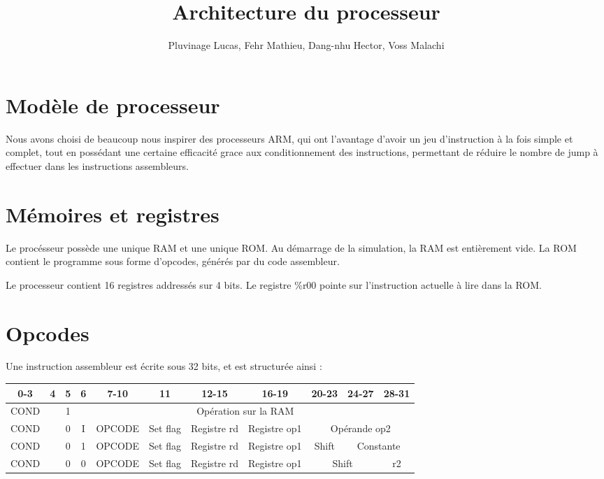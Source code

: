 \documentclass[a4paper]{article}
\title{Architecture du processeur}
\author{Pluvinage Lucas, Fehr Mathieu, Dang-nhu Hector, Voss Malachi}
\begin{document}
\maketitle

\section{Modèle de processeur}

Nous avons choisi de beaucoup nous inspirer des processeurs ARM, qui ont
l'avantage d'avoir un jeu d'instruction à la fois simple et complet, tout en
possédant une certaine efficacité grace aux conditionnement des instructions,
permettant de réduire le nombre de jump à effectuer dans les instructions
assembleurs.

\section{Mémoires et registres}

Le procésseur possède une unique RAM et une unique ROM. Au démarrage de la
simulation, la RAM est entièrement vide. La ROM contient le programme sous forme
d'opcodes, générés par du code assembleur.

Le processeur contient 16 registres addressés sur 4 bits. Le registre \%r00
pointe sur l'instruction actuelle à lire dans la ROM.

\section{Opcodes}

Une instruction assembleur est écrite sous 32 bits, et est structurée ainsi :

\begin{tabular}{|c|c|c|c|c|c|c|c|c|c|c|}
  \hline
  0-3  & 4 & 5 & 6 & 7-10 & 11 & 12-15 & 16-19 & 20-23 & 24-27 & 28-31 \\
  \hline
  COND &   & 1 & \multicolumn{8}{c|}{Opération sur la RAM} \\
  \hline
  COND &   & 0 & I & OPCODE & Set flag & Registre rd & Registre op1 & \multicolumn{3}{c|}{Opérande op2}  \\
  \hline
  COND &   & 0 & 1 & OPCODE & Set flag & Registre rd &Registre op1 & Shift & \multicolumn{2}{c|}{Constante} \\
  \hline
  COND &   & 0 & 0 & OPCODE & Set flag & Registre rd & Registre op1 & \multicolumn{2}{c|}{Shift} & r2  \\
  \hline
\end{tabular}
\end{document}
